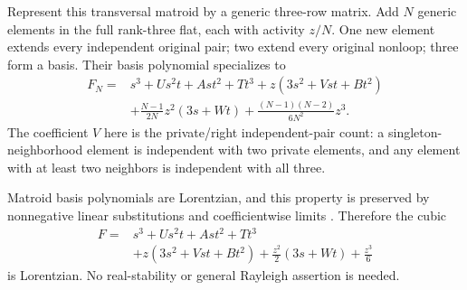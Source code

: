 \documentclass[11pt,a4paper]{article}
\theoremstyle{remark}\newtheorem{remark}[theorem]{Remark}
\begin{document}
Represent this transversal matroid by a generic three-row matrix. Add $N$ generic elements in the full rank-three flat, each with activity $z/N$. One new element extends every independent original pair; two extend every original nonloop; three form a basis. Their basis polynomial specializes to
\begin{align*}
 F_N={}&s^3+Us^2t+Ast^2+Tt^3+z(3s^2+Vst+Bt^2)\\
 &+\frac{N-1}{2N}z^2(3s+Wt)
   +\frac{(N-1)(N-2)}{6N^2}z^3.
\end{align*}
The coefficient $V$ here is the private/right independent-pair count: a singleton-neighborhood element is independent with two private elements, and any element with at least two neighbors is independent with all three.

Matroid basis polynomials are Lorentzian, and this property is preserved by nonnegative linear substitutions and coefficientwise limits \cite{b:BH}. Therefore the cubic
\begin{equation}\label{mrn:e:cc:eq:F}
 \begin{split}
 F={}&s^3+Us^2t+Ast^2+Tt^3\\
 &+z(3s^2+Vst+Bt^2)+\frac{z^2}{2}(3s+Wt)+\frac{z^3}{6}
 \end{split}
\end{equation}
is Lorentzian. No real-stability or general Rayleigh assertion is needed.
\end{document}
